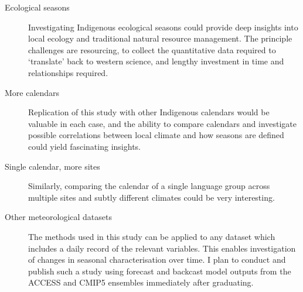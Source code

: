 \begin{description}
\item[Ecological seasons]
        Investigating Indigenous ecological seasons could provide deep insights
        into local ecology and traditional natural resource management.
        The principle challenges are resourcing, to collect the quantitative
        data required to `translate' back to western science, and lengthy
        investment in time and relationships required.

\item [More calendars]
        Replication of this study with other Indigenous calendars would be
        valuable in each case, and the ability to compare calendars and investigate
        possible correlations between local climate and how seasons are
        defined could yield fascinating insights.

\item [Single calendar, more sites]
        Similarly, comparing the calendar of a single language group across
        multiple sites and subtly different climates could be very interesting.

\item [Other meteorological datasets]
        The methods used in this study can be applied to any dataset which
        includes a daily record of the relevant variables.  This enables
        investigation of changes in seasonal characterisation over time.
        I plan to conduct and publish such a study using forecast and backcast
        model outputs from the ACCESS and CMIP5 ensembles immediately
        after graduating.

\item []
        

\end{description}



